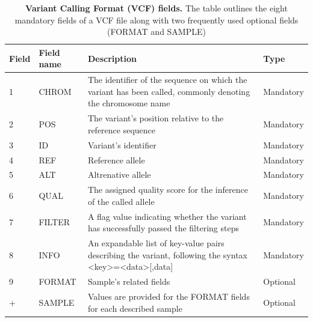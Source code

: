 \documentclass[a4paper, titlepage, openright]{book}
\begin{document}
\begin{table}[h!]
	\centering
	\begin{tabular}{|p{1cm}|p{2cm}|p{7cm}|p{2cm}|}
		\hline
		\textbf{Field}& \textbf{Field name}& \textbf{Description}& \textbf{Type}\\
		\hline
		1 & CHROM & The identifier of the sequence on which the variant has been called, commonly denoting the chromosome name & Mandatory\\
		\hline
		2 & POS & The variant's position relative to the reference sequence & Mandatory\\
		\hline
		3 & ID & Variant's identifier & Mandatory\\
		\hline
		4 & REF & Reference allele & Mandatory\\
		\hline
		5 & ALT & Altrenative allele & Mandatory\\
		\hline
		6 & QUAL & The assigned quality score for the inference of the called allele & Mandatory\\
		\hline
		7 & FILTER & A flag value indicating whether the variant has successfully passed the filtering steps & Mandatory\\
		\hline
		8 & INFO & An expandable list of key-value pairs describing the variant, following the syntax <key>=<data>[,data] & Mandatory\\
		\hline
		9 & FORMAT & Sample's related fields & Optional\\
		\hline
		+ & SAMPLE & Values are provided for the FORMAT fields for each described sample & Optional\\
		\hline
	\end{tabular}
	\caption[Variant Calling Format (VCF) fields]{\textbf{Variant Calling Format (VCF) fields.} The table outlines the eight mandatory fields of a VCF file along with two frequently used optional fields (FORMAT and SAMPLE)}
	\label{table:vcf-fields}
\end{table}

\end{document}
